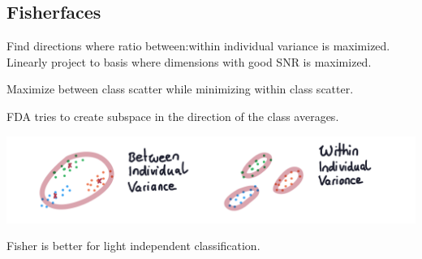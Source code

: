 \subsection{Fisherfaces}
Find directions where ratio between:within individual variance is maximized. Linearly project to basis where dimensions with good SNR is maximized.

\begin{algorithm}
  Maximize between class scatter while minimizing within class scatter.
\end{algorithm}

FDA tries to create subspace in the direction of the class averages.

\includegraphics*[width=\linewidth]{assets/variances.png}

Fisher is better for light independent classification.
